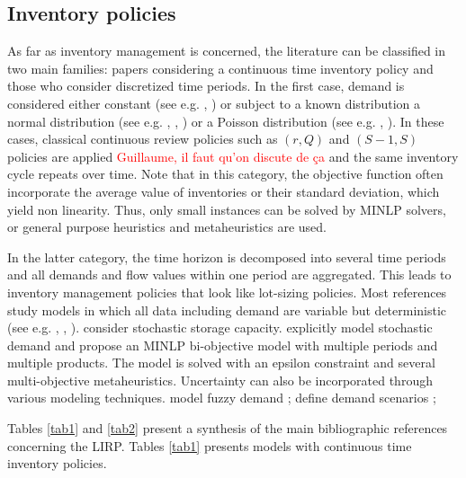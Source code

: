 \documentclass[a4paper,10pt]{article}
\begin{document}
\begin{linenumbers}
\subsection{Inventory policies}
\label{sec:i}

As far as inventory management is concerned, the literature can be classified in two main families: papers considering a continuous time inventory policy 
and those who consider discretized time periods. 
In the first case, demand is considered either constant (see e.g. \cite{AhmSed2012}, \cite{Deng2016}) or subject to a known distribution a 
normal distribution (see e.g. \cite{Nekooghadirli2014}, \cite{Zhalechian2016}, \cite{Saragih2018}) or a Poisson distribution (see e.g. \cite{Asadi2018}, \cite{HabibiAS2018}). In these cases, classical continuous review policies such as $(r,Q)$ and $(S-1,S)$ policies are applied \textcolor{red}{Guillaume, il faut qu'on discute de ça} and the same inventory cycle repeats over time. Note that in this category, the objective function often incorporate the average value of inventories or their standard deviation, which yield non linearity. Thus, only small instances can be solved by MINLP solvers, or general purpose heuristics and metaheuristics are used. 


In the latter category, the time horizon is decomposed into several time periods and all demands and flow values within one period are aggregated. This leads to inventory management policies that look like lot-sizing policies. Most references study models in which all data including demand are variable but deterministic (see e.g. \cite{Guerrero2013}, \cite{Zhang2014}, \cite{Ghorbani2016}). 
\cite{Vahdani2018} consider stochastic storage capacity. 
\cite{Rayat2017} explicitly model stochastic demand and propose an MINLP bi-objective model with multiple periods and multiple products. The model is solved with an epsilon constraint and several multi-objective metaheuristics. 
Uncertainty can also be incorporated through various modeling techniques. 
\cite{ChenChenSunLiu2014, TavakkoliIFAC2016} model fuzzy demand ; \cite{Bashiri2018} define demand scenarios ; 


Tables \ref{tab1} and \ref{tab2} present a synthesis of the main bibliographic references concerning the LIRP. 
Tables \ref{tab1} presents models with continuous time inventory policies. 




\end{linenumbers}
\end{document}
